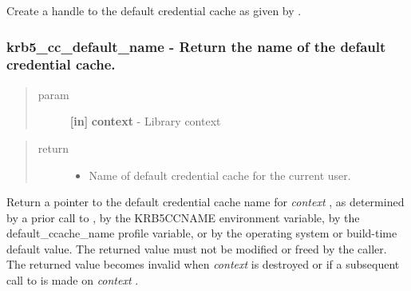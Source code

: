 \documentclass[letterpaper,10pt,english]{sphinxmanual}
\begin{document}
Create a handle to the default credential cache as given by {\hyperref[appdev/refs/api/krb5_cc_default_name:krb5_cc_default_name]{}} .


\subsubsection{krb5\_cc\_default\_name -  Return the name of the default credential cache.}
\label{appdev/refs/api/krb5_cc_default_name::doc}\label{appdev/refs/api/krb5_cc_default_name:krb5-cc-default-name-return-the-name-of-the-default-credential-cache}

\begin{fulllineitems}
\label{appdev/refs/api/krb5_cc_default_name:krb5_cc_default_name}
\end{fulllineitems}

\begin{quote}\begin{description}
\item[{param}] \leavevmode
\textbf{{[}in{]}} \textbf{context} - Library context

\end{description}\end{quote}
\begin{quote}\begin{description}
\item[{return}] \leavevmode\begin{itemize}
\item {} 
Name of default credential cache for the current user.

\end{itemize}

\end{description}\end{quote}

Return a pointer to the default credential cache name for \emph{context} , as determined by a prior call to {\hyperref[appdev/refs/api/krb5_cc_set_default_name:krb5_cc_set_default_name]{}} , by the KRB5CCNAME environment variable, by the default\_ccache\_name profile variable, or by the operating system or build-time default value. The returned value must not be modified or freed by the caller. The returned value becomes invalid when \emph{context} is destroyed {\hyperref[appdev/refs/api/krb5_free_context:krb5_free_context]{}} or if a subsequent call to {\hyperref[appdev/refs/api/krb5_cc_set_default_name:krb5_cc_set_default_name]{}} is made on \emph{context} .
\end{document}
